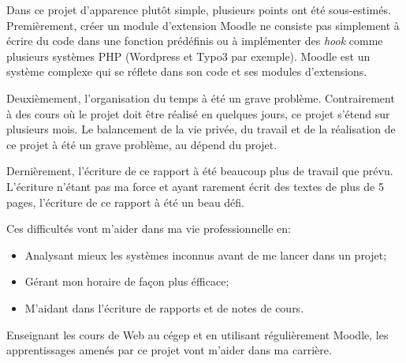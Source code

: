 \begin{conclusion}

Dans ce projet d'apparence plut\^ot simple, plusieurs points ont été sous-estim\'es.
Premi\`erement, cr\'eer un module d'extension Moodle ne consiste pas simplement \`a \'ecrire du code dans une fonction pr\'ed\'efinis ou \`a impl\'ementer des \textit{hook} comme plusieurs syst\`emes PHP (Wordpress et Typo3 par exemple).
Moodle est un syst\`eme complexe qui se r\'eflete dans son code et ses modules d'extensions.

Deuxi\`emement, l'organisation du temps \`a \'et\'e un grave probl\`eme.
Contrairement \`a des cours o\`u le projet doit \^etre r\'ealis\'e en quelques jours, ce projet s'\'etend sur plusieurs mois.
Le balancement de la vie priv\'ee, du travail et de la r\'ealisation de ce projet \`a \'et\'e un grave probl\`eme, au d\'epend du projet.

Derni\`erement, l'\'ecriture de ce rapport \`a \'et\'e beaucoup plus de travail que pr\'evu.
L'\'ecriture n'\'etant pas ma force et ayant rarement \'ecrit des textes de plus de 5 pages, l'\'ecriture de ce rapport \`a \'et\'e un beau d\'efi.

Ces difficult\'es vont m'aider dans ma vie professionnelle en:
\begin{itemize}
  \item Analysant mieux les syst\`emes inconnus avant de me lancer dans un projet;
  \item G\'erant mon horaire de fa\c{c}on plus \'efficace;
  \item M'aidant dans l'\'ecriture de rapports et de notes de cours.
\end{itemize}

Enseignant les cours de Web au c\'egep et en utilisant r\'eguli\`erement Moodle, les apprentissages amen\'es par ce projet vont m'aider dans ma carri\`ere.

\end{conclusion}

